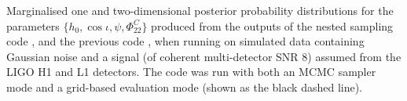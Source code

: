 \label{fig:simsignal_multi}
Marginalised one and two-dimensional posterior probability distributions
for the parameters $\{h_0, \cos{\iota}, \psi, \Phi_{22}^C\}$
produced from the outputs of the nested sampling code \lppen, and the previous
code \lppe, when running on simulated data containing Gaussian noise and a signal 
(of coherent multi-detector SNR 8) assumed from the LIGO H1 and L1 detectors. The \lppe code was run with both an MCMC sampler mode and a grid-based
evaluation mode (shown as the black dashed line).
